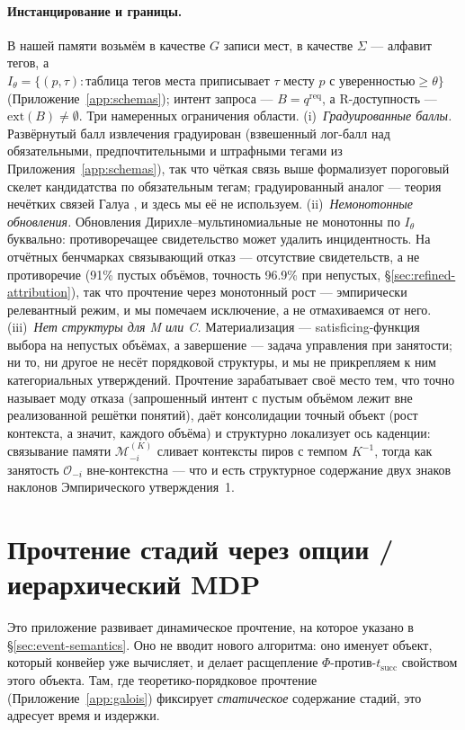 \documentclass{article}
\begin{document}
\paragraph{Инстанцирование и границы.}
В нашей памяти возьмём в качестве $G$ записи мест, в качестве $\Sigma$ --- алфавит тегов, а $I_\theta = \{(p,\tau) : \text{таблица тегов места приписывает } \tau \text{ месту } p \text{ с уверенностью} \ge \theta\}$ (Приложение~\ref{app:schemas}); интент запроса --- $B = q^{\mathrm{req}}$, а R-доступность --- $\mathrm{ext}(B) \ne \emptyset$. Три намеренных ограничения области. (i)~\emph{Градуированные баллы.} Развёрнутый балл извлечения градуирован (взвешенный лог-балл над обязательными, предпочтительными и штрафными тегами из Приложения~\ref{app:schemas}), так что чёткая связь выше формализует пороговый скелет кандидатства по обязательным тегам; градуированный аналог --- теория нечётких связей Галуа \citep{belohlavek1999fuzzy}, и здесь мы её не используем. (ii)~\emph{Немонотонные обновления.} Обновления Дирихле--мультиномиальные не монотонны по $I_\theta$ буквально: противоречащее свидетельство может удалить инцидентность. На отчётных бенчмарках связывающий отказ --- отсутствие свидетельств, а не противоречие (91\% пустых объёмов, точность 96.9\% при непустых, \S\ref{sec:refined-attribution}), так что прочтение через монотонный рост --- эмпирически релевантный режим, и мы помечаем исключение, а не отмахиваемся от него. (iii)~\emph{Нет структуры для M или C.} Материализация --- satisficing-функция выбора на непустых объёмах, а завершение --- задача управления при занятости; ни то, ни другое не несёт порядковой структуры, и мы не прикрепляем к ним категориальных утверждений. Прочтение зарабатывает своё место тем, что точно называет моду отказа (запрошенный интент с пустым объёмом лежит вне реализованной решётки понятий), даёт консолидации точный объект (рост контекста, а значит, каждого объёма) и структурно локализует ось каденции: связывание памяти $\mathcal{M}^{(K)}_{-i}$ сливает контексты пиров с темпом $K^{-1}$, тогда как занятость $\mathcal{O}_{-i}$ вне-контекстна --- что и есть структурное содержание двух знаков наклонов Эмпирического утверждения~1.

\section{Прочтение стадий через опции / иерархический MDP}
\label{app:hmdp}

Это приложение развивает динамическое прочтение, на которое указано в
\S\ref{sec:event-semantics}. Оно не вводит нового алгоритма: оно именует
объект, который конвейер уже вычисляет, и делает расщепление
$\Phi$-против-$t_{\mathrm{succ}}$ свойством этого объекта. Там, где
теоретико-порядковое прочтение (Приложение~\ref{app:galois}) фиксирует \emph{статическое}
содержание стадий, это адресует время и издержки.
\end{document}
